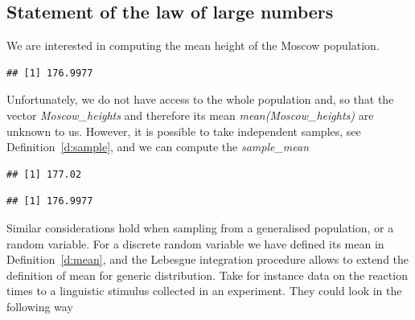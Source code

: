 	\subsection{Statement of the law of large numbers }
	We are interested in computing the mean height of the Moscow population. 
\begin{knitrout}
\color{fgcolor}\begin{kframe}
\begin{alltt}
 \hlkwb{<-} 
 \hlkwb{<-} \hlopt{*} \hlopt{+} 
\end{alltt}
\begin{verbatim}
## [1] 176.9977
\end{verbatim}
\end{kframe}
\end{knitrout}
	Unfortunately, we do not have access to the whole population and, so that the vector  \textit{Moscow\_heights} and therefore its mean \textit{mean(Moscow\_heights)} are unknown to us. However, it is possible to take independent samples, see Definition~\ref{d:sample}, and we can compute the \textit{sample\_mean} 
\begin{knitrout}
\color{fgcolor}\begin{kframe}
\begin{alltt}
 \hlkwb{<-}   
 \hlkwb{<-} 
 \hlkwb{<-} 
\end{alltt}
\begin{verbatim}
## [1] 177.02
\end{verbatim}
\begin{alltt}
\end{alltt}
\begin{verbatim}
## [1] 176.9977
\end{verbatim}
\end{kframe}
\end{knitrout}
	Similar considerations hold when sampling from a generalised population, or a random variable. For a discrete random variable we have defined its mean in Definition~\ref{d:mean}, and the Lebesgue integration procedure allows to extend the definition of mean for generic distribution. Take for instance data on the reaction times to a linguistic stimulus collected in an experiment. They could look in the following way
